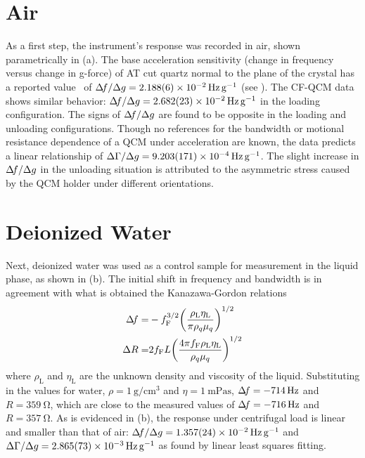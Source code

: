 \section{Air}
As a first step, the instrument's response was recorded in air, shown
parametrically in (a).  The base acceleration
sensitivity (change in frequency versus change in g-force) of AT cut quartz
normal to the plane of the crystal has a reported
value~\cite{valdois2794influence} of $\df/\Delta g
=\SI{2.188+-0.006e-2}{\hertz\per\g}$ (see
).  The CF-QCM data shows similar
behavior: $\df/\Delta g =\SI{2.682+-0.023e-2}{\hertz\per\g}$ in the loading
configuration.  The signs of $\Delta\!f/\Delta g$ are found to be opposite in the
loading and unloading configurations.  Though no references for
the bandwidth or motional resistance dependence of a QCM under
acceleration are known, the data predicts a linear relationship of $\dg/\Delta g =
\SI{9.203+-0.171e-4}{\hertz\per\g}$.  The slight increase in $\Delta\!f/\Delta g$
in the unloading situation is attributed to the asymmetric stress caused by
the QCM holder under different orientations.

\section{Deionized Water}
Next, deionized water was used as a control sample for measurement in the
liquid phase, as shown in (b).  The initial shift in
frequency and bandwidth is in agreement with what is obtained the
Kanazawa-Gordon relations~\cite{kanazawa1985frequency}
\begin{align}
				\Delta\!f=&-f_{\text{F}}^{3/2}{\left(\frac{\rho_{\text{L}}\eta_{\text{L}}}{\pi\rho_{q}\mu_{q}}\right)}^{1/2}\\
				\Delta R=&2f_{\text{F}}L{\left(\frac{4\pi
				f_{\text{F}}\rho_{\text{L}}\eta_{\text{L}}}{\rho_{q}\mu_{q}}\right)}^{1/2}
\end{align}
where $\rho_{\text{L}}$ and $\eta_{\text{L}}$ are the unknown density and
viscosity of the liquid.   Substituting in the values for water,
$\rho=\SI{1}{\gram\per\centi\meter\cubed}$ and
$\eta=\SI{1}{\milli\pascal\second}$, $\Delta\!f = \SI{-714}{\hertz}$ and
$R=\SI{359}{\ohm}$, which are close to the measured values of $\Delta\!f =
\SI{-716}{\hertz}$ and $R=\SI{357}{\ohm}$.  As is evidenced in
(b), the response under centrifugal
load is linear and smaller than that of air: $\df/\Delta g=
\SI{1.357+-0.024e-2}{\hertz \per\g}$ and $\dg/\Delta g=
\SI{2.865+-0.073e-3}{\hertz\per\g}$ as found by linear least squares fitting.

